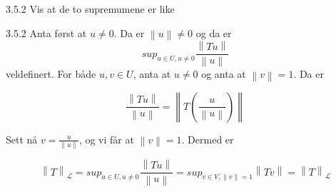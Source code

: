 \documentclass[a4paper,norsk]{article}
\begin{document}
\begin{oppgavebox}{3.5.2}{}
Vis at de to supremumene er like
\begin{proofbox}{3.5.2}{}
Anta først at $ u \neq 0 $. Da er $ \left\lVert u \right\rVert \neq 0 $ og da er 
\[
    sup_{u \in  U, u\neq0} \frac{ \left\lVert Tu \right\rVert  }{ \left\lVert u \right\rVert  }
\]
veldefinert. For både $ u, v \in U $, anta at $ u \neq 0 $ og anta at $ \left\lVert v \right\rVert  = 1 $. Da er

\[
    \frac{ \left\lVert Tu \right\rVert  }{ \left\lVert u \right\rVert  } = \left\lVert T \left( \frac{ u }{ \left\lVert u \right\rVert  } \right)  \right\rVert 
\]

Sett nå $ v = \frac{ u }{ \left\lVert u \right\rVert  } $, og vi får at $ \left\lVert v \right\rVert =1 $. Dermed er

\[
    \left\lVert T \right\rVert _{\mathcal{L}} = sup_{u \in U, u\neq 0} \frac{ \left\lVert Tu \right\rVert  }{ \left\lVert u \right\rVert  } = sup_{v \in V, \left\lVert v \right\rVert =1} \left\lVert Tv \right\rVert = \left\lVert T \right\rVert _{\mathcal{L}}
\]
\end{proofbox}
\end{oppgavebox}
\end{document}
